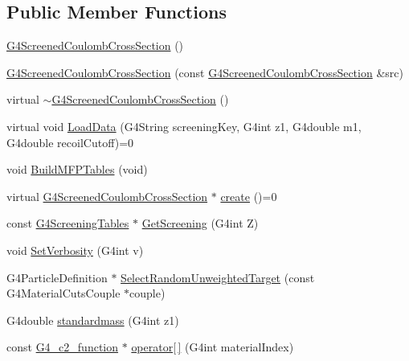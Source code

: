 \subsection*{Public Member Functions}
\begin{DoxyCompactItemize}
\item 
\hyperlink{classG4ScreenedCoulombCrossSection_aa28efa2005fe5926327fb4876c653dd9}{G4\+Screened\+Coulomb\+Cross\+Section} ()
\item 
\hyperlink{classG4ScreenedCoulombCrossSection_a59e0eca08ea23847ea01fab7c7f2a98c}{G4\+Screened\+Coulomb\+Cross\+Section} (const \hyperlink{classG4ScreenedCoulombCrossSection}{G4\+Screened\+Coulomb\+Cross\+Section} \&src)
\item 
virtual \hyperlink{classG4ScreenedCoulombCrossSection_a8f1b09470e3a5e04b4d6ff1ef4f041b8}{$\sim$\+G4\+Screened\+Coulomb\+Cross\+Section} ()
\item 
virtual void \hyperlink{classG4ScreenedCoulombCrossSection_a36f7010b3075c363a96c037b018cdfa5}{Load\+Data} (G4\+String screening\+Key, G4int z1, G4double m1, G4double recoil\+Cutoff)=0
\item 
void \hyperlink{classG4ScreenedCoulombCrossSection_a21351e02c8b9eccdea7ae30f2e7db3fe}{Build\+M\+F\+P\+Tables} (void)
\item 
virtual \hyperlink{classG4ScreenedCoulombCrossSection}{G4\+Screened\+Coulomb\+Cross\+Section} $\ast$ \hyperlink{classG4ScreenedCoulombCrossSection_a381cca52e9ba2c41cb838474334629ce}{create} ()=0
\item 
const \hyperlink{structG4ScreeningTables}{G4\+Screening\+Tables} $\ast$ \hyperlink{classG4ScreenedCoulombCrossSection_accbe78a66a124161bd938c5fa1217d2a}{Get\+Screening} (G4int Z)
\item 
void \hyperlink{classG4ScreenedCoulombCrossSection_a8aff8c06482b63d344883107bf1a93d4}{Set\+Verbosity} (G4int v)
\item 
G4\+Particle\+Definition $\ast$ \hyperlink{classG4ScreenedCoulombCrossSection_ab072a5e6932cf49bd8c2e24512dcf78f}{Select\+Random\+Unweighted\+Target} (const G4\+Material\+Cuts\+Couple $\ast$couple)
\item 
G4double \hyperlink{classG4ScreenedCoulombCrossSection_a90cfe2fb3343c4ef563d558cf3df21f8}{standardmass} (G4int z1)
\item 
const \hyperlink{G4ScreenedNuclearRecoil_8hh_a679aa602c6cfde1625601e0314b3cc01}{G4\+\_\+c2\+\_\+function} $\ast$ \hyperlink{classG4ScreenedCoulombCrossSection_a102e24c7581ba1249306290eff349225}{operator\mbox{[}$\,$\mbox{]}} (G4int material\+Index)
\end{DoxyCompactItemize}
